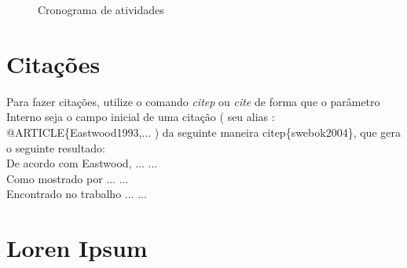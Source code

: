 \begin{figure}[h!]
\begin{center}
\begin{ganttchart}

\end{ganttchart}
\end{center}
\caption{Cronograma de atividades}
\label{fig:gantt}
\end{figure}

\section{Citações}
    Para fazer citações, utilize o comando \textit{citep} ou \textit{cite} de forma que o parâmetro Interno seja o campo inicial de uma citação ( seu alias :  @ARTICLE\{Eastwood1993,...   ) da seguinte maneira  citep\{swebok2004\}, que gera o seguinte resultado: \citep{swebok2004}
    \\
    De acordo com Eastwood, ... \citep{Eastwood1993} ...\\
    Como mostrado por ... \citep{CavalcantiEASE2013} ... \\
    Encontrado no trabalho ... \citep{Bugzilla}...\\
    
\section{Loren Ipsum}
\lipsum[1-2]